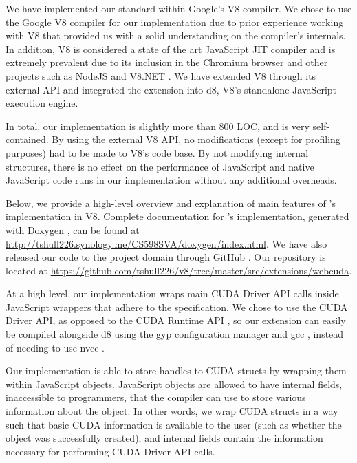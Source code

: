 
We have implemented our \name standard within Google's V8 \cite{V8website}
compiler.   We chose to use the Google V8  compiler for our implementation due
to prior experience working with V8 that  provided us with a solid
understanding on the compiler's internals. In addition, V8 is considered a state
of the art JavaScript JIT compiler and is extremely prevalent due to its
inclusion in the Chromium browser \cite{chromium} and other projects such as
NodeJS \cite{nodeJS} and V8.NET \cite{V8.NET}. We have extended V8 through its
external API and integrated the extension into d8, V8's standalone JavaScript
execution engine. 

In total, our implementation is slightly more than 800 LOC, and is very
self-contained. By using the external V8 API, no modifications (except for
profiling purposes) had to be made to V8's code base. By not modifying internal
structures, there is no effect on the performance of JavaScript and native
JavaScript code runs in our implementation without any additional overheads.

Below, we provide a high-level overview and explanation of main features of
\namens's implementation in V8.  Complete documentation for \namens's implementation,
generated with Doxygen \cite{doxygen}, can be found at
\url{http://tshull226.synology.me/CS598SVA/doxygen/index.html}. We
have also released our code to the project domain through GitHub \cite{github}.
Our repository is located at
\url{https://github.com/tshull226/v8/tree/master/src/extensions/webcuda}.

At a high level, our implementation wraps main CUDA Driver API \cite{cudaAPI}
calls inside JavaScript wrappers that adhere to the \name specification. We
chose to use the CUDA Driver API, as opposed to the CUDA Runtime API
\cite{cudaRuntimeAPI}, so our extension can easily be compiled alongside d8
using the gyp \cite{gyp} configuration manager and gcc \cite{gcc}, instead of
needing to use nvcc \cite{nvcc}.

Our implementation is able to store handles to CUDA structs by wrapping them
within JavaScript objects. JavaScript objects are allowed to have internal
fields, inaccessible to programmers, that the compiler can use to store various
information about the object. In other words, we wrap CUDA structs in a way such that
basic CUDA information is available to the user (such as whether the object was
successfully created), and internal fields contain the information
necessary for performing CUDA Driver API calls.

